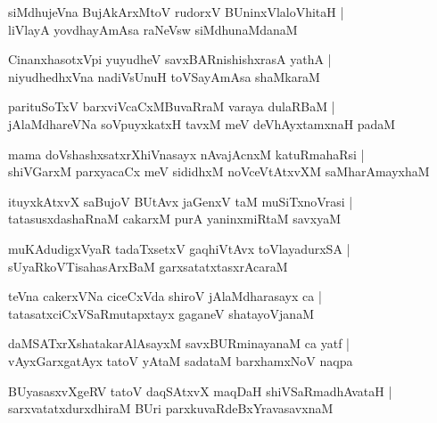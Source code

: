 \documentclass[twoside,12pt,openright]{book}
\newcounter{shloka}[chapter]
\begin{document}
\begin{shloka}%
siMdhujeVna BujAkArxMtoV rudorxV BUninxVlaloVhitaH |\\
liVlayA yovdhayAmAsa raNeVsw siMdhunaMdanaM 
\end{shloka}

\begin{shloka}%
CinanxhasotxVpi yuyudheV savxBARnishishxrasA yathA |\\
niyudhedhxVna nadiVsUnuH toVSayAmAsa shaMkaraM 
\end{shloka}

\begin{shloka}%
parituSoTxV barxviVcaCxMBuvaRraM varaya dulaRBaM |\\
jAlaMdhareVNa soVpuyxkatxH tavxM meV deVhAyxtamxnaH padaM
\end{shloka}

\begin{shloka}%
mama doVshashxsatxrXhiVnasayx nAvajAcnxM katuRmahaRsi |\\
shiVGarxM parxyacaCx meV sididhxM noVceVtAtxvXM saMharAmayxhaM 
\end{shloka}

\begin{shloka}%
ituyxkAtxvX saBujoV BUtAvx jaGenxV taM muSiTxnoVrasi |\\
tatasusxdashaRnaM cakarxM purA yaninxmiRtaM savxyaM 
\end{shloka}

\begin{shloka}%
muKAdudigxVyaR tadaTxsetxV gaqhiVtAvx toVlayadurxSA |\\
sUyaRkoVTisahasArxBaM garxsatatxtasxrAcaraM 
\end{shloka}

\begin{shloka}%
teVna cakerxVNa ciceCxVda shiroV jAlaMdharasayx ca |\\
tatasatxciCxVSaRmutapxtayx gaganeV shatayoVjanaM
\end{shloka}

\begin{shloka}%
daMSATxrXshatakarAlAsayxM savxBURminayanaM ca yatf |\\
vAyxGarxgatAyx tatoV yAtaM sadataM barxhamxNoV naqpa
\end{shloka}

\begin{shloka}%
BUyasasxvXgeRV tatoV daqSAtxvX maqDaH shiVSaRmadhAvataH |\\
sarxvatatxdurxdhiraM BUri parxkuvaRdeBxYravasavxnaM 
\end{shloka}
\end{document}
